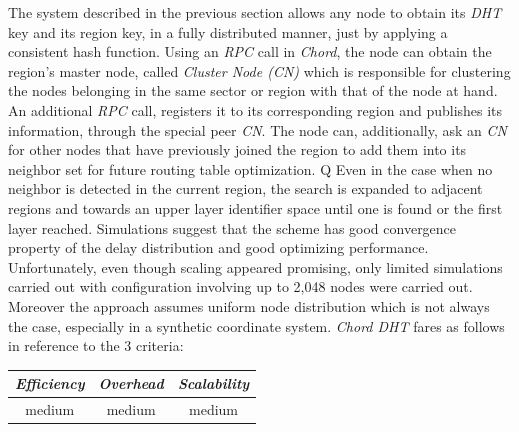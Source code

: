 The system described in the previous section 
allows any node to obtain its \emph{DHT} key and its region key, in a fully
distributed manner, just by applying a consistent hash function. 
Using an {\sl RPC} call in \emph{Chord}, 
the node can obtain the region's master node, 
called \emph{Cluster Node (CN)} which is responsible for clustering 
the nodes belonging in the same sector or region with that of the node at hand. 
An additional {\sl RPC} call, registers it to its corresponding region 
and publishes its information, through the special peer \emph{CN}. 
The node can, additionally, ask an \emph{CN} for other
nodes that have previously joined the region to add them into its
neighbor set for future routing table optimization. Q
Even in the case when no
neighbor is detected in the current region, the search is expanded to adjacent
regions and towards an upper layer identifier space until one is found or the
first layer reached. Simulations suggest that the scheme has good convergence
property of the delay distribution and good optimizing performance.
Unfortunately, even though scaling appeared promising, only limited 
simulations carried out with configuration involving up to 2,048 nodes 
were carried out.
Moreover the approach assumes uniform node distribution which
is not always the case, especially in a synthetic coordinate system.
\emph{Chord DHT} fares as follows in reference to the $3$ criteria:
\begin{center}
{\footnotesize
\begin{tabular}{ccc}
\emph{Efficiency} & \emph{Overhead} & \emph{Scalability} \\
\hline
%
medium &
%
medium &
%
medium
\end{tabular}
}
\end{center}



